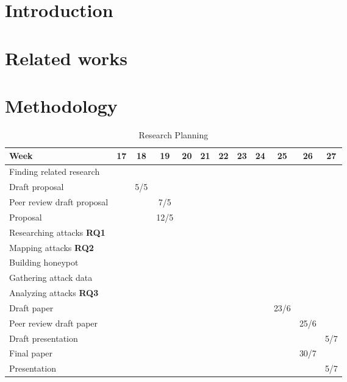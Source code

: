 \documentclass{sig-alternate-br}
\begin{document}


\section{Introduction}

\section{Related works}

\section{Methodology}

\begin{table*}[t]
\centering \caption{Research Planning}
\begin{tabular}{|l|c|c|c|c|c|c|c|c|c|c|c|} \hline
Week&17&18&19&20&21&22&23&24&25&26&27\\ \hline 
Finding related research&\cellcolor{gray}&\cellcolor{gray}&&&&&&&&&\\ \hline
Draft proposal&&\cellcolor{gray}5/5&&&&&&&&&\\ \hline
Peer review draft proposal&&&\cellcolor{gray}7/5&&&&&&&& \\ \hline
Proposal&&&\cellcolor{gray}12/5&&&&&&&&\\ \hline
Researching attacks \textbf{RQ1}&&&\cellcolor{gray}&\cellcolor{gray}&&&&&&&\\ \hline
Mapping attacks \textbf{RQ2}&&&&\cellcolor{gray}&\cellcolor{gray}&&&&&&\\ \hline
Building honeypot&&&&&\cellcolor{gray}&\cellcolor{gray}&&&&&\\ \hline
Gathering attack data&&&&&&\cellcolor{gray}&\cellcolor{gray}&\cellcolor{gray}&&&\\ \hline
Analyzing attacks \textbf{RQ3}&&&&&&\cellcolor{gray}&\cellcolor{gray}&\cellcolor{gray}&&&\\ \hline
Draft paper&&&&&&&\cellcolor{gray}&\cellcolor{gray}&\cellcolor{gray}23/6&&\\ \hline
Peer review draft paper&&&&&&&&&&\cellcolor{gray}25/6&\\ \hline
Draft presentation&&&&&&&&&\cellcolor{gray}&\cellcolor{gray}&\cellcolor{gray}5/7\\ \hline
Final paper&&&&&&&&&&\cellcolor{gray}30/7&\\ \hline
Presentation&&&&&&&&&&&\cellcolor{gray}5/7\\ \hline
\end{tabular}
\end{table*}
\end{document}
